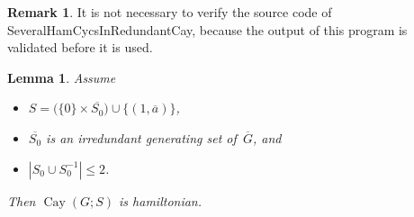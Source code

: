 \documentclass[]{amcjoucc}
\theoremstyle{plain}
\newtheorem{lem}[equation]{Lemma}
\theoremstyle{definition}
\theoremstyle{definition}
\newtheorem{rem}[equation]{Remark}
\DeclareMathOperator{\Cay}{Cay}
\newcommand{\quot}{\overline}
\newcommand{\function}[1]{\textsf{#1}}
\begin{document}
\begin{rem}
It is not necessary to verify the source code of \function{SeveralHamCycsInRedundantCay}, because the output of this program is validated before it is used.
\end{rem}

\begin{lem} \label{valence2}
Assume 
	\begin{itemize}
	\item $S = \bigl( \{ 0 \}\times \quot{S_0} \bigr) \cup \{ (1,\quot a) \}$, 
	\item $\quot{S_0}$ is an irredundant generating set of~$\quot G$, 
	and 
	\item $|S_0 \cup S_0^{-1}| \le 2$.
	\end{itemize}
Then $\Cay(G;S)$ is hamiltonian.
\end{lem}
\end{document}
